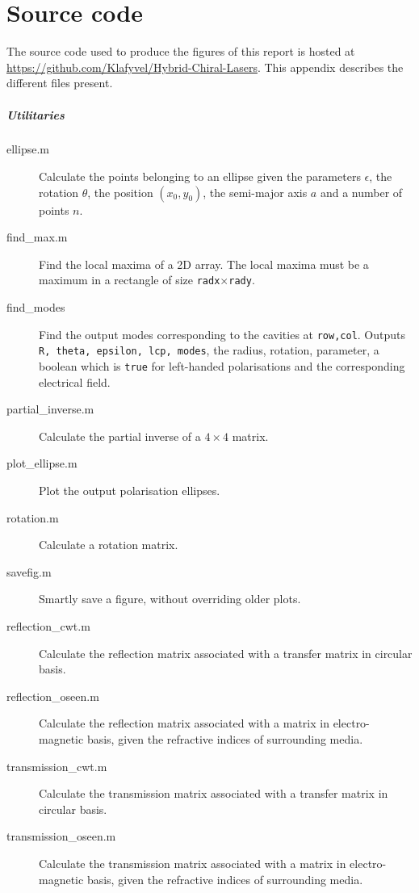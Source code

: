 \chapter{Source code}
\label{chap:sourcecode}

The source code used to produce the figures of this report is hosted at \url{https://github.com/Klafyvel/Hybrid-Chiral-Lasers}. This appendix describes the different files present.

\paragraph{Utilitaries}

\begin{description}
	\item[ellipse.m] Calculate the points belonging to an ellipse given the parameters $\epsilon$, the rotation $\theta$, the position $(x_0, y_0)$, the semi-major axis $a$ and a number of points $n$.
	\item[find_max.m] Find the local maxima of a 2D array. The local maxima must be a maximum in a rectangle of size \verb|radx|$\times$\verb|rady|.
	\item[find_modes] Find the output modes corresponding to the cavities at \verb|row,col|. Outputs \verb|R, theta, epsilon, lcp, modes|, the radius, rotation, parameter, a boolean which is \verb|true| for left-handed polarisations and the corresponding electrical field.
	\item[partial_inverse.m] Calculate the partial inverse of a $4\times4$ matrix.
	\item[plot_ellipse.m] Plot the output polarisation ellipses.
	\item[rotation.m] Calculate a rotation matrix.
	\item[savefig.m] Smartly save a figure, without overriding older plots.
	\item[reflection_cwt.m] Calculate the reflection matrix associated with a transfer matrix in circular basis.
	\item[reflection_oseen.m] Calculate the reflection matrix associated with a matrix in electro-magnetic basis, given the refractive indices of surrounding media.
	\item[transmission_cwt.m] Calculate the transmission matrix associated with a transfer matrix in circular basis.
	\item[transmission_oseen.m] Calculate the transmission matrix associated with a matrix in electro-magnetic basis, given the refractive indices of surrounding media.
\end{description}

